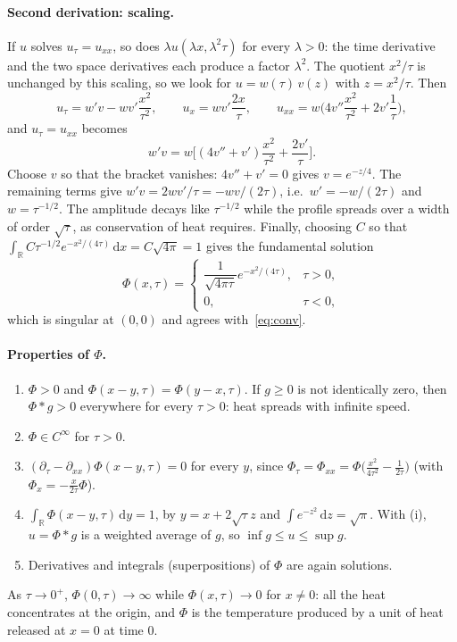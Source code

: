 \documentclass[11pt,a4paper]{article}
\theoremstyle{definition}
\theoremstyle{remark}
\newcommand{\dd}{\,\mathrm{d}}
\begin{document}
\paragraph{Second derivation: scaling.} If $u$ solves $u_\tau=u_{xx}$, so does $\lambda u(\lambda x,\lambda^2\tau)$ for every
$\lambda>0$: the time derivative and the two space derivatives each produce a factor $\lambda^2$. The quotient
$x^2/\tau$ is unchanged by this scaling, so we look for $u=w(\tau)\,v(z)$ with $z=x^2/\tau$. Then
\[
  u_\tau=w'v-wv'\frac{x^2}{\tau^2},\qquad u_x=wv'\frac{2x}{\tau},\qquad
  u_{xx}=w\Big(4v''\frac{x^2}{\tau^2}+2v'\frac1\tau\Big),
\]
and $u_\tau=u_{xx}$ becomes
\[
  w'v=w\Big[(4v''+v')\frac{x^2}{\tau^2}+\frac{2v'}{\tau}\Big].
\]
Choose $v$ so that the bracket vanishes: $4v''+v'=0$ gives $v=e^{-z/4}$. The remaining terms give
$w'v=2wv'/\tau=-wv/(2\tau)$, i.e.\ $w'=-w/(2\tau)$ and $w=\tau^{-1/2}$. The amplitude decays like $\tau^{-1/2}$
while the profile spreads over a width of order $\sqrt\tau$, as conservation of heat requires. Finally, choosing
$C$ so that $\int_{\mathbb R}C\tau^{-1/2}e^{-x^2/(4\tau)}\dd x=C\sqrt{4\pi}=1$ gives the fundamental solution
\[
  \Phi(x,\tau)=\begin{cases}\dfrac{1}{\sqrt{4\pi\tau}}e^{-x^2/(4\tau)}, & \tau>0,\\[4pt] 0, & \tau<0,\end{cases}
\]
which is singular at $(0,0)$ and agrees with~\eqref{eq:conv}.

\paragraph{Properties of $\Phi$.}
\begin{enumerate}
  \item[(i)] $\Phi>0$ and $\Phi(x-y,\tau)=\Phi(y-x,\tau)$. If $g\ge0$ is not identically zero, then
    $\Phi*g>0$ everywhere for every $\tau>0$: heat spreads with infinite speed.
  \item[(ii)] $\Phi\in C^\infty$ for $\tau>0$.
  \item[(iii)] $(\partial_\tau-\partial_{xx})\Phi(x-y,\tau)=0$ for every $y$, since
    $\Phi_\tau=\Phi_{xx}=\Phi\big(\frac{x^2}{4\tau^2}-\frac1{2\tau}\big)$ (with $\Phi_x=-\frac{x}{2\tau}\Phi$).
  \item[(iv)] $\int_{\mathbb R}\Phi(x-y,\tau)\dd y=1$, by $y=x+2\sqrt\tau z$ and $\int e^{-z^2}\dd z=\sqrt\pi$. With (i),
    $u=\Phi*g$ is a weighted average of $g$, so $\inf g\le u\le\sup g$.
  \item[(v)] Derivatives and integrals (superpositions) of $\Phi$ are again solutions.
\end{enumerate}
As $\tau\to0^+$, $\Phi(0,\tau)\to\infty$ while $\Phi(x,\tau)\to0$ for $x\neq0$: all the heat concentrates at the
origin, and $\Phi$ is the temperature produced by a unit of heat released at $x=0$ at time $0$.
\end{document}
